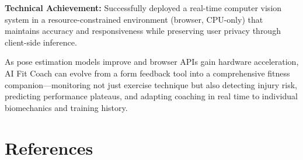 \documentclass[12pt,a4paper]{article}
\begin{document}
\textbf{Technical Achievement:} Successfully deployed a real-time computer 
vision system in a resource-constrained environment (browser, CPU-only) that 
maintains accuracy and responsiveness while preserving user privacy through 
client-side inference.

As pose estimation models improve and browser APIs gain hardware acceleration, 
AI Fit Coach can evolve from a form feedback tool into a comprehensive fitness 
companion---monitoring not just exercise technique but also detecting injury 
risk, predicting performance plateaus, and adapting coaching in real time to 
individual biomechanics and training history.

\section{References}
\end{document}
